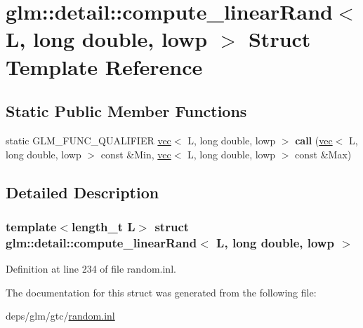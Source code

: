 \hypertarget{structglm_1_1detail_1_1compute__linearRand_3_01L_00_01long_01double_00_01lowp_01_4}{}\section{glm\+:\+:detail\+:\+:compute\+\_\+linear\+Rand$<$ L, long double, lowp $>$ Struct Template Reference}
\label{structglm_1_1detail_1_1compute__linearRand_3_01L_00_01long_01double_00_01lowp_01_4}
\subsection*{Static Public Member Functions}
\begin{DoxyCompactItemize}
\item 
\mbox{\label{structglm_1_1detail_1_1compute__linearRand_3_01L_00_01long_01double_00_01lowp_01_4_ab0bcc952fa04f0769035b63bc055b405}} 
static G\+L\+M\+\_\+\+F\+U\+N\+C\+\_\+\+Q\+U\+A\+L\+I\+F\+I\+ER \hyperlink{structglm_1_1vec}{vec}$<$ L, long double, lowp $>$ {\bfseries call} (\hyperlink{structglm_1_1vec}{vec}$<$ L, long double, lowp $>$ const \&Min, \hyperlink{structglm_1_1vec}{vec}$<$ L, long double, lowp $>$ const \&Max)
\end{DoxyCompactItemize}


\subsection{Detailed Description}
\subsubsection*{template$<$length\+\_\+t L$>$\newline
struct glm\+::detail\+::compute\+\_\+linear\+Rand$<$ L, long double, lowp $>$}



Definition at line 234 of file random.\+inl.



The documentation for this struct was generated from the following file\+:\begin{DoxyCompactItemize}
\item 
deps/glm/gtc/\hyperlink{random_8inl}{random.\+inl}\end{DoxyCompactItemize}
